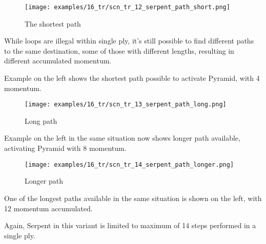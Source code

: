\vspace*{-0.7\baselineskip}
\noindent
\begin{wrapfigure}[9]{l}{0.4\textwidth}
\centering
\texttt{[image: examples/16\_tr/scn\_tr\_12\_serpent\_path\_short.png]}
\vspace*{-0.5\baselineskip}
\caption{The shortest path}
\label{fig:scn_tr_12_serpent_path_short}
\end{wrapfigure}
While loops are illegal within single ply, it's still possible to find
different paths to the same destination, some of those with different
lengths, resulting in different accumulated momentum.

Example on the left shows the shortest path possible to activate Pyramid,
with 4 momentum.


\vspace*{0.7\baselineskip}
\noindent
\begin{wrapfigure}[4]{l}{0.4\textwidth}
\centering
\texttt{[image: examples/16\_tr/scn\_tr\_13\_serpent\_path\_long.png]}
\vspace*{-0.5\baselineskip}
\caption{Long path}
\label{fig:scn_tr_13_serpent_path_long}
\end{wrapfigure}
Example on the left in the same situation now shows longer path available,
activating Pyramid with 8 momentum.


\vspace*{5.7\baselineskip}
\noindent
\begin{wrapfigure}[7]{l}{0.4\textwidth}
\centering
\texttt{[image: examples/16\_tr/scn\_tr\_14\_serpent\_path\_longer.png]}
\vspace*{-0.5\baselineskip}
\caption{Longer path}
\label{fig:scn_tr_14_serpent_path_longer}
\end{wrapfigure}
One of the longest paths available in the same situation is shown on the left,
with 12 momentum accumulated.

Again, Serpent in this variant is limited to maximum of 14 steps performed in a
single ply.

\clearpage %

